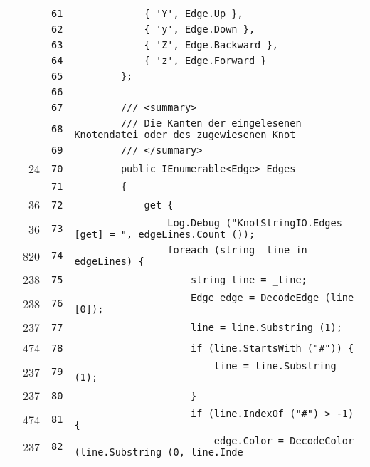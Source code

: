 \documentclass[a4paper,10pt]{article}
\begin{document}
\begin{longtable}[l]{lrrl}
\cellcolor{gray} &  & \verb~61~ & \verb~            { 'Y', Edge.Up },~\\
\cellcolor{gray} &  & \verb~62~ & \verb~            { 'y', Edge.Down },~\\
\cellcolor{gray} &  & \verb~63~ & \verb~            { 'Z', Edge.Backward },~\\
\cellcolor{gray} &  & \verb~64~ & \verb~            { 'z', Edge.Forward }~\\
\cellcolor{gray} &  & \verb~65~ & \verb~        };~\\
\cellcolor{gray} &  & \verb~66~ & \verb~~\\
\cellcolor{gray} &  & \verb~67~ & \verb~        /// <summary>~\\
\cellcolor{gray} &  & \verb~68~ & \verb~        /// Die Kanten der eingelesenen Knotendatei oder des zugewiesenen Knot~\\
\cellcolor{gray} &  & \verb~69~ & \verb~        /// </summary>~\\
\cellcolor{green} & 24 & \verb~70~ & \verb~        public IEnumerable<Edge> Edges~\\
\cellcolor{gray} &  & \verb~71~ & \verb~        {~\\
\cellcolor{green} & 36 & \verb~72~ & \verb~            get {~\\
\cellcolor{green} & 36 & \verb~73~ & \verb~                Log.Debug ("KnotStringIO.Edges [get] = ", edgeLines.Count ());~\\
\cellcolor{green} & 820 & \verb~74~ & \verb~                foreach (string _line in edgeLines) {~\\
\cellcolor{green} & 238 & \verb~75~ & \verb~                    string line = _line;~\\
\cellcolor{green} & 238 & \verb~76~ & \verb~                    Edge edge = DecodeEdge (line [0]);~\\
\cellcolor{green} & 237 & \verb~77~ & \verb~                    line = line.Substring (1);~\\
\cellcolor{green} & 474 & \verb~78~ & \verb~                    if (line.StartsWith ("#")) {~\\
\cellcolor{green} & 237 & \verb~79~ & \verb~                        line = line.Substring (1);~\\
\cellcolor{green} & 237 & \verb~80~ & \verb~                    }~\\
\cellcolor{green} & 474 & \verb~81~ & \verb~                    if (line.IndexOf ("#") > -1) {~\\
\cellcolor{green} & 237 & \verb~82~ & \verb~                        edge.Color = DecodeColor (line.Substring (0, line.Inde~\\

\end{longtable}
\end{document}
